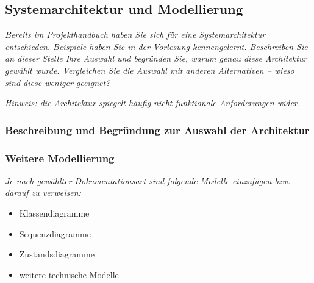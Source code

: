\subsection{Systemarchitektur und Modellierung}

\textit{
    Bereits im Projekthandbuch haben Sie sich für eine Systemarchitektur entschieden. Beispiele haben Sie in der Vorlesung kennengelernt. Beschreiben Sie an dieser Stelle Ihre Auswahl und begründen Sie, warum genau diese Architektur gewählt wurde. Vergleichen Sie die Auswahl mit anderen Alternativen – wieso sind diese weniger geeignet?
}

\textit{
    Hinweis: die Architektur spiegelt häufig nicht-funktionale Anforderungen wider.
}

\subsubsection{Beschreibung und Begründung zur Auswahl der Architektur}



\subsubsection{Weitere Modellierung}

\textit{Je nach gewählter Dokumentationsart sind folgende Modelle einzufügen bzw. darauf zu verweisen:}
\begin{itemize}
    \item Klassendiagramme
    \item Sequenzdiagramme
    \item Zustandsdiagramme
    \item weitere technische Modelle
\end{itemize}
